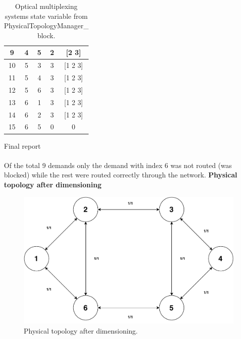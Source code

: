 \begin{table}[H]
\begin{tabular}{|c|c|c|c|c|}
		9        & 4          & 5               & 2                                                                       & {[}2 3{]}                                                         \\ \hline
		10       & 5          & 3               & 3                                                                       & {[}1 2 3{]}                                                       \\ \hline
		11       & 5          & 4               & 3                                                                       & {[}1 2 3{]}                                                       \\ \hline
		12       & 5          & 6               & 3                                                                       & {[}1 2 3{]}                                                       \\ \hline
		13       & 6          & 1               & 3                                                                       & {[}1 2 3{]}                                                       \\ \hline
		14       & 6          & 2               & 3                                                                       & {[}1 2 3{]}                                                       \\ \hline
		15       & 6          & 5               & 0                                                                       & 0                                                                 \\ \hline
	\end{tabular}
	\caption{Optical multiplexing systems state variable from PhysicalTopologyManager\_  block.}
	\label{OMS_example}
\end{table}

\Large Final report\\ \\

\normalsize Of the total 9 demands only the demand with index 6 was not routed (was blocked) while the rest were routed correctly through the network.
\clearpage
\textbf{Physical topology after dimensioning}
\begin{figure}[H]
	\centering
	\includegraphics[width=13cm]{sdf/heuristic/transparent/figures/physicalAfterDimensioning}
	\caption{Physical topology after dimensioning.}
\end{figure} 

